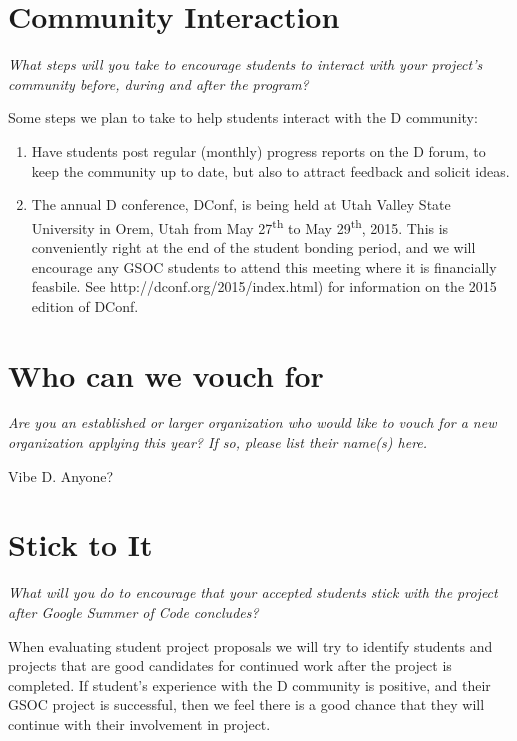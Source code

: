 \documentclass[a4paper,12pt]{article}
\begin{document}
\section{Community Interaction}
\emph{What steps will you take to encourage students to interact 
with your project's community before, during and after 
the program?}

Some steps we plan to take to help students interact with
the D community:

\begin{enumerate}
\item Have students post regular (monthly) progress reports
on the D forum, to keep the community up to date, but also
to attract feedback and solicit ideas.
\item The annual D conference, DConf, is being held at Utah
Valley State University in Orem, Utah from May 27\textsuperscript{th}
to May 29\textsuperscript{th}, 2015. This is conveniently right at 
the end of the student bonding period, and we will encourage any
GSOC students to attend this meeting where it is financially 
feasbile. See http://dconf.org/2015/index.html) for information on 
the 2015 edition of DConf.
\end{enumerate}

\section{Who can we vouch for}
\emph{Are you an established or larger organization who would like to 
vouch for a new organization applying this year? If so, please 
list their name(s) here.}

Vibe D.   Anyone?

\section{Stick to It}
\emph{What will you do to encourage that your accepted students stick 
with the project after Google Summer of Code concludes?}

When evaluating student project proposals we will try to identify
students and projects that are good candidates for continued work
after the project is completed.  If student's experience with the 
D community is positive, and their GSOC project is successful, then
we feel there is a good chance that they will continue with their
involvement in project. 
\end{document}
